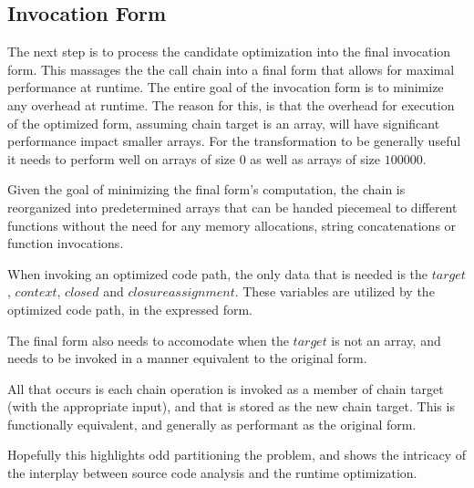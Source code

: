 \subsection{Invocation Form}
The next step is to process the candidate optimization into the final invocation form.  This massages the the call chain into a final form that allows for maximal performance at runtime.  The entire goal of the invocation form is to minimize any overhead at runtime.  The reason for this, is that the overhead for execution of the optimized form, assuming chain target is an array, will have significant performance impact smaller arrays.  For the transformation to be generally useful it needs to perform well on arrays of size $0$ as well as arrays of size $100000$.  

\begin{minipage}{\linewidth}

\end{minipage}

Given the goal of minimizing the final form's computation, the chain is reorganized into predetermined arrays that can be handed piecemeal to different functions without the need for any memory allocations, string concatenations or function invocations.

When invoking an optimized code path, the only data that is needed is the $target$, $context$, $closed$ and $closure assignment$.  These variables are utilized by the optimized code path, in the expressed form. 

The final form also needs to accomodate when the $target$ is not an array, and needs to be invoked in a manner equivalent to the original form.  

\begin{minipage}{\linewidth}

\end{minipage}

All that occurs is each chain operation is invoked as a member of chain target (with the appropriate input), and that is stored as the new chain target.  This is functionally equivalent, and generally as performant as the original form. %




Hopefully this highlights odd partitioning the problem, and shows the intricacy of the interplay between source code analysis and the runtime optimization.  